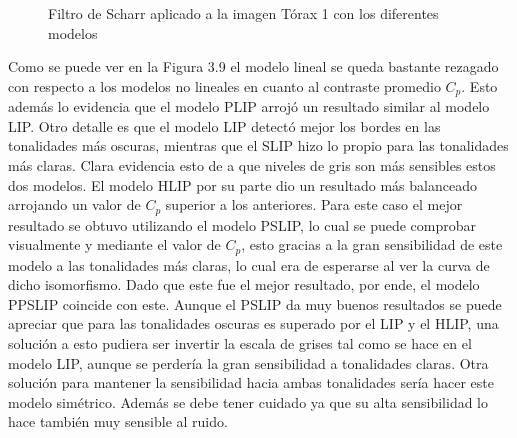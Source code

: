 \begin{figure}
\begin{center}
		\caption{Filtro de Scharr aplicado a la imagen T\'orax 1 con los diferentes modelos}
	\end{center}
\end{figure} 

Como se puede ver en la Figura 3.9 el modelo lineal se queda bastante rezagado con respecto a los modelos no lineales en cuanto al contraste promedio $C_p$. Esto adem\'as lo evidencia que el modelo PLIP arroj\'o un resultado similar al modelo LIP. Otro detalle es que el modelo LIP detect\'o mejor los bordes en las tonalidades m\'as oscuras, mientras que el SLIP hizo lo propio para las tonalidades m\'as claras. Clara evidencia esto de a que niveles de gris son m\'as sensibles estos dos modelos. El modelo HLIP por su parte dio un resultado m\'as balanceado arrojando un valor de $C_p$ superior a los anteriores. Para este caso el mejor resultado se obtuvo utilizando el modelo PSLIP, lo cual se puede comprobar visualmente y mediante el valor de $C_p$, esto gracias a la gran sensibilidad de este modelo a las tonalidades m\'as claras, lo cual era de esperarse al ver la curva de dicho isomorfismo. Dado que este fue el mejor resultado, por ende, el modelo PPSLIP coincide con este. Aunque el PSLIP da muy buenos resultados se puede apreciar que para las tonalidades oscuras es superado por el LIP y el HLIP, una soluci\'on a esto pudiera ser invertir la escala de grises tal como se hace en el modelo LIP, aunque se perder\'ia la gran sensibilidad a tonalidades claras. Otra soluci\'on para mantener la sensibilidad hacia ambas tonalidades ser\'ia hacer este modelo sim\'etrico. Adem\'as se debe tener cuidado ya que su alta sensibilidad lo hace tambi\'en muy sensible al ruido.

